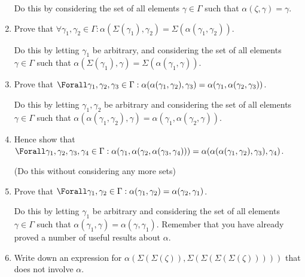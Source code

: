 \begin{enumerate}
  Do this by considering the set of all elements \(\gamma \in \Gamma\) such that
  \(\alpha(\zeta, \gamma) = \gamma\).
 \item
  Prove that
  \(\forall \gamma_1, \gamma_2 \in \Gamma :
    \alpha(\Sigma(\gamma_1), \gamma_2) = \Sigma(\alpha(\gamma_1, \gamma_2))\).

  Do this by letting \(\gamma_1\) be arbitrary, and considering the set of all
  elements \(\gamma \in \Gamma\) such that
  \(\alpha(\Sigma(\gamma_1), \gamma) = \Sigma(\alpha(\gamma_1, \gamma))\).
 \item
  Prove that
  \(\Forall \gamma_1, \gamma_2, \gamma_3 \in \Gamma :
    \alpha(\alpha(\gamma_1, \gamma_2), \gamma_3) =
    \alpha(\gamma_1, \alpha(\gamma_2, \gamma_3))\).

  Do this by letting \(\gamma_1, \gamma_2\) be arbitrary and considering the set
  of all elements \(\gamma \in \Gamma\) such that
  \(\alpha(\alpha(\gamma_1, \gamma_2), \gamma)
  = \alpha(\gamma_1, \alpha(\gamma_2, \gamma))\).
 \item
  Hence show that
  \(\Forall \gamma_1, \gamma_2, \gamma_3, \gamma_4 \in \Gamma :
    \alpha(\gamma_1, \alpha(\gamma_2, \alpha(\gamma_3, \gamma_4))) =
    \alpha(\alpha(\alpha(\gamma_1, \gamma_2), \gamma_3), \gamma_4)\).

  (Do this without considering any more sets)
 \item
  Prove that
  \(\Forall \gamma_1, \gamma_2 \in \Gamma :
    \alpha(\gamma_1, \gamma_2) = \alpha(\gamma_2, \gamma_1)\).

  Do this by letting \(\gamma_1\) be arbitrary and considering the set of all
  elements \(\gamma \in \Gamma\) such that
  \(\alpha(\gamma_1, \gamma) = \alpha(\gamma, \gamma_1)\). Remember that you
  have already proved a number of useful results about \(\alpha\).
 \item
  Write down an expression for
  \(\alpha(\Sigma(\Sigma(\zeta)), \Sigma(\Sigma(\Sigma(\Sigma(\zeta)))))\) that
  does not involve \(\alpha\).


\end{enumerate}
